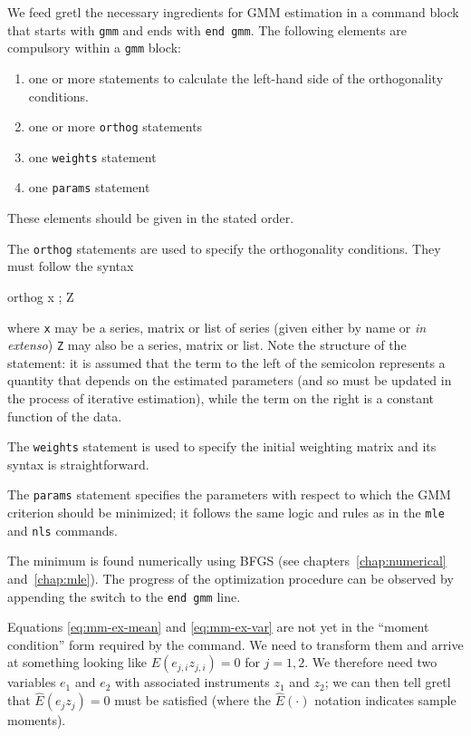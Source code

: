 We feed gretl the necessary ingredients for GMM estimation in a
command block that starts with \texttt{gmm} and ends with \texttt{end
  gmm}. The following elements are compulsory within a \texttt{gmm}
block:
\begin{enumerate}
\item one or more statements to calculate the left-hand side of the
  orthogonality conditions.
\item one or more \texttt{orthog} statements
\item one \texttt{weights} statement
\item one \texttt{params} statement
\end{enumerate}
These elements should be given in the stated order.

The \texttt{orthog} statements are used to specify the orthogonality
conditions.  They must follow the syntax
\begin{code}
  orthog x ; Z
\end{code}
where \texttt{x} may be a series, matrix or list of series (given either
by name or \textit{in extenso}) \texttt{Z} may also be a series, matrix or
list. Note the structure of the statement: it is assumed that the term to
the left of the semicolon represents a quantity that depends on the
estimated parameters (and so must be updated in the process of iterative
estimation), while the term on the right is a constant function of the data.

The \texttt{weights} statement is used to specify the initial
weighting matrix and its syntax is straightforward. 

The \texttt{params} statement specifies the parameters with respect to
which the GMM criterion should be minimized; it follows the same logic
and rules as in the \texttt{mle} and \texttt{nls} commands.

The minimum is found numerically using BFGS (see
chapters~\ref{chap:numerical} and~\ref{chap:mle}).  The progress of
the optimization procedure can be observed by appending the
 switch to the \texttt{end gmm} line.

\bigskip

Equations \ref{eq:mm-ex-mean} and \ref{eq:mm-ex-var} are not yet in
the ``moment condition'' form required by the  command. We
need to transform them and arrive at something looking like
$E(e_{j,i} z_{j,i}) = 0$ for $j=1, 2$. We therefore need two variables
$e_1$ and $e_2$ with associated instruments $z_1$ and $z_2$; we can
then tell gretl that $\hat{E}(e_j z_j) = 0$ must be satisfied (where
the $\hat{E}(\cdot)$ notation indicates sample moments).


